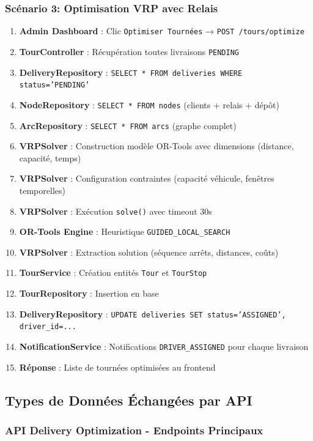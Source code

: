 \subsubsection{Scénario 3: Optimisation VRP avec Relais}

\begin{enumerate}
    \item \textbf{Admin Dashboard} : Clic \texttt{Optimiser Tournées} → \texttt{POST /tours/optimize}
    \item \textbf{TourController} : Récupération toutes livraisons \texttt{PENDING}
    \item \textbf{DeliveryRepository} : \texttt{SELECT * FROM deliveries WHERE status='PENDING'}
    \item \textbf{NodeRepository} : \texttt{SELECT * FROM nodes} (clients + relais + dépôt)
    \item \textbf{ArcRepository} : \texttt{SELECT * FROM arcs} (graphe complet)
    \item \textbf{VRPSolver} : Construction modèle OR-Tools avec dimensions (distance, capacité, temps)
    \item \textbf{VRPSolver} : Configuration contraintes (capacité véhicule, fenêtres temporelles)
    \item \textbf{VRPSolver} : Exécution \texttt{solve()} avec timeout 30s
    \item \textbf{OR-Tools Engine} : Heuristique \texttt{GUIDED\_LOCAL\_SEARCH}
    \item \textbf{VRPSolver} : Extraction solution (séquence arrêts, distances, coûts)
    \item \textbf{TourService} : Création entités \texttt{Tour} et \texttt{TourStop}
    \item \textbf{TourRepository} : Insertion en base
    \item \textbf{DeliveryRepository} : \texttt{UPDATE deliveries SET status='ASSIGNED', driver\_id=...}
    \item \textbf{NotificationService} : Notifications \texttt{DRIVER\_ASSIGNED} pour chaque livraison
    \item \textbf{Réponse} : Liste de tournées optimisées au frontend
\end{enumerate}

\subsection{Types de Données Échangées par API}

\subsubsection{API Delivery Optimization - Endpoints Principaux}

